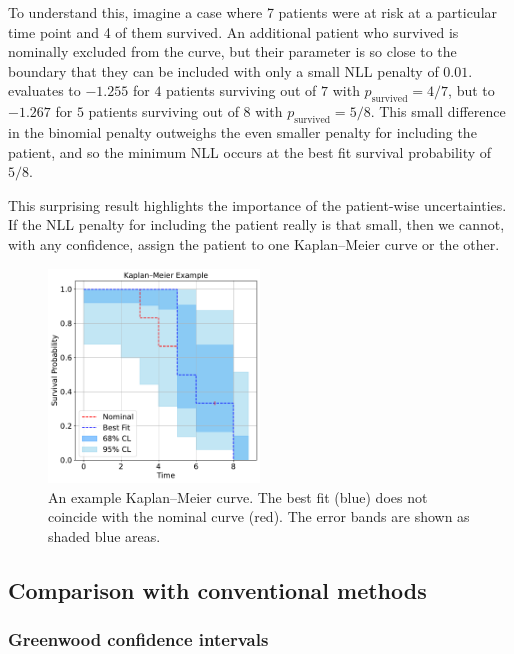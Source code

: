 \documentclass[article]{jss}
\newcommand{\KM}{Kaplan--Meier} %
\begin{document}
To understand this, imagine a case where 7 patients were at risk at a particular time point and 4 of them survived. An additional patient who survived is nominally excluded from the curve, but their parameter is so close to the boundary that they can be included with only a small NLL penalty of \(0.01\)\@.  evaluates to \(-1.255\) for \(4\) patients surviving out of \(7\) with \(p_\text{survived}=4/7\), but to \(-1.267\) for \(5\) patients surviving out of \(8\) with \(p_\text{survived}=5/8\). This small difference in the binomial penalty outweighs the even smaller penalty for including the patient, and so the minimum NLL occurs at the best fit survival probability of \(5/8\).

This surprising result highlights the importance of the patient-wise uncertainties. If the NLL penalty for including the patient really is that small, then we cannot, with any confidence, assign the patient to one \KM{} curve or the other.

\begin{figure}
  \centering
  \includegraphics[width=0.5\textwidth]{km_example.pdf}
  \caption{\label{fig:best-fit-vs-nominal} An example \KM{} curve. The best fit (blue) does not coincide with the nominal curve (red). The error bands are shown as shaded blue areas.}
\end{figure}

\subsection{Comparison with conventional methods}\label{sec:compare-to-conventional}

\subsubsection{Greenwood confidence intervals}\label{sec:compare-to-greenwood}
\end{document}
